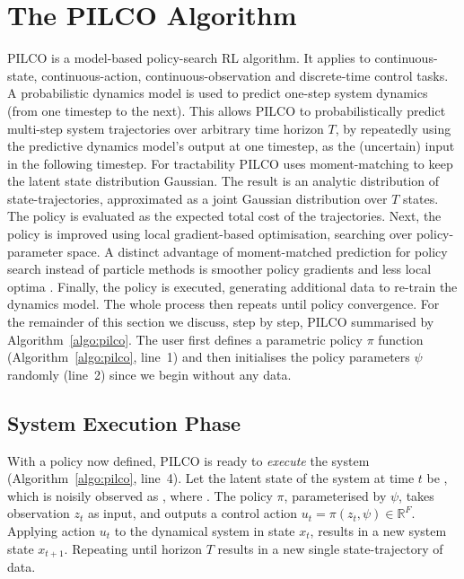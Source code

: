 \documentclass{article}
\newcommand{\N}{\mathcal{N}}
\newcommand{\now}[1]{#1_t}
\newcommand{\new}[1]{#1_{t+1}}
\newcommand{\policyparams}{\psi} %
\begin{document}
\section{The PILCO Algorithm}\label{sec:pilco}

\newcommand{\linedefpolicy}{1}
\newcommand{\lineinitpolicy}{2}
\newcommand{\lineexecute}{4}
\newcommand{\linetrain}{5}
\newcommand{\linepredict}{6}
\newcommand{\lineevaluate}{7}
\newcommand{\lineoptimise}{8}

PILCO is a model-based policy-search RL algorithm.
It applies to continuous-state, continuous-action, continuous-observation and
discrete-time control tasks.
A probabilistic dynamics model is used to predict one-step system dynamics
(from one timestep to the next).
This allows PILCO to probabilistically predict multi-step system trajectories
over arbitrary time horizon $T$,
by repeatedly using the predictive dynamics model's output at one timestep,
as the (uncertain) input
in the following timestep.
For tractability PILCO uses moment-matching to keep the latent state distribution Gaussian.
The result is an analytic distribution of state-trajectories,
approximated %
as a joint Gaussian distribution over $T$ states. %
The policy is evaluated as the expected total cost of the trajectories.
Next, the policy is improved using local gradient-based optimisation,
searching over policy-parameter space. %
A distinct advantage of moment-matched prediction for policy search
instead of particle methods
is smoother policy gradients and less local optima \cite{mchutchon2014}.
Finally, the policy is executed, generating additional data
to re-train the dynamics model.
The whole process then repeats until policy convergence.
%
For the remainder of this section
we discuss, step by step, PILCO summarised by Algorithm~\ref{algo:pilco}.
The user first defines a parametric policy $\pi$ function (Algorithm~\ref{algo:pilco}, line~\linedefpolicy)
and then initialises the policy parameters $\policyparams$ randomly (line~\lineinitpolicy)
since we begin without any data.

\subsection{System Execution Phase}
With a policy now defined, PILCO is ready to \textit{execute} the system (Algorithm~\ref{algo:pilco}, line~\lineexecute).
Let the latent state of the system at time $t$ be \smash{$\now{x}\in\mathbb{R}^D$},
which is noisily observed as \smash{$\now{z}=\now{x}+\now{\epsilon}$},
where \smash{$\now{\epsilon}\stackrel{iid}{\sim}\N(0,\Sigma^\epsilon)$}.
%
The policy $\pi$, parameterised by $\policyparams$,
takes observation $\now{z}$ as input,
and outputs a control action $\now{u}=\pi(\now{z},\policyparams)\in\mathbb{R}^F$.
%
Applying action $\now{u}$ to the dynamical system in state $\now{x}$,
results in a new system state $\new{x}$. %
%
Repeating until horizon $T$ results in a new single state-trajectory of data.
\end{document}
